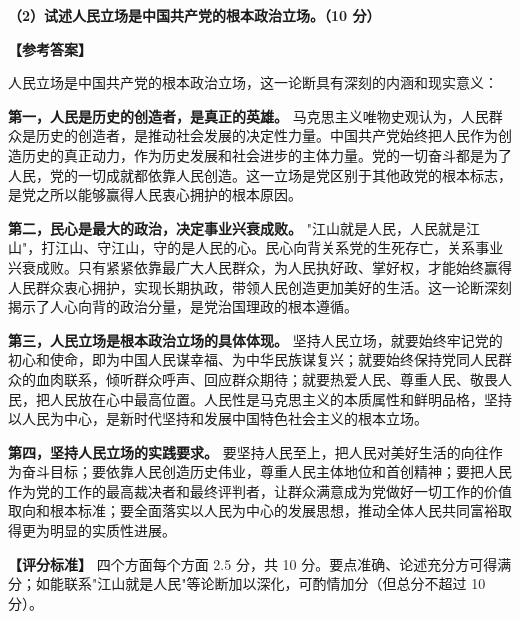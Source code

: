 \documentclass[12pt, a4paper]{article}
\begin{document}
\begin{answerbox}
\textbf{（2）试述人民立场是中国共产党的根本政治立场。（10 分）}

\textbf{【参考答案】}

人民立场是中国共产党的根本政治立场，这一论断具有深刻的内涵和现实意义：

\textbf{第一，人民是历史的创造者，是真正的英雄。} 马克思主义唯物史观认为，人民群众是历史的创造者，是推动社会发展的决定性力量。中国共产党始终把人民作为创造历史的真正动力，作为历史发展和社会进步的主体力量。党的一切奋斗都是为了人民，党的一切成就都依靠人民创造。这一立场是党区别于其他政党的根本标志，是党之所以能够赢得人民衷心拥护的根本原因。

\textbf{第二，民心是最大的政治，决定事业兴衰成败。} "江山就是人民，人民就是江山"，打江山、守江山，守的是人民的心。民心向背关系党的生死存亡，关系事业兴衰成败。只有紧紧依靠最广大人民群众，为人民执好政、掌好权，才能始终赢得人民群众衷心拥护，实现长期执政，带领人民创造更加美好的生活。这一论断深刻揭示了人心向背的政治分量，是党治国理政的根本遵循。

\textbf{第三，人民立场是根本政治立场的具体体现。} 坚持人民立场，就要始终牢记党的初心和使命，即为中国人民谋幸福、为中华民族谋复兴；就要始终保持党同人民群众的血肉联系，倾听群众呼声、回应群众期待；就要热爱人民、尊重人民、敬畏人民，把人民放在心中最高位置。人民性是马克思主义的本质属性和鲜明品格，坚持以人民为中心，是新时代坚持和发展中国特色社会主义的根本立场。

\textbf{第四，坚持人民立场的实践要求。} 要坚持人民至上，把人民对美好生活的向往作为奋斗目标；要依靠人民创造历史伟业，尊重人民主体地位和首创精神；要把人民作为党的工作的最高裁决者和最终评判者，让群众满意成为党做好一切工作的价值取向和根本标准；要全面落实以人民为中心的发展思想，推动全体人民共同富裕取得更为明显的实质性进展。

\textbf{【评分标准】} 四个方面每个方面 2.5 分，共 10 分。要点准确、论述充分方可得满分；如能联系"江山就是人民"等论断加以深化，可酌情加分（但总分不超过 10 分）。
\end{answerbox}
\end{document}

